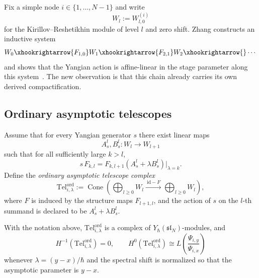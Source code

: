 Fix a simple node $i\in\{1,\dots,N-1\}$ and write
\begin{equation}
W_l:=W^{(i)}_{l,0}
\end{equation}
for the Kirillov--Reshetikhin module of level $l$ and zero shift. Zhang
constructs an inductive system
\begin{equation}
W_0\xhookrightarrow{F_{1,0}}W_1\xhookrightarrow{F_{2,1}}W_2\xhookrightarrow{}\cdots
\end{equation}
and shows that the Yangian action is affine-linear in the stage parameter
along this system~\cite{Zhang24}. The new observation is that this chain
already carries its own derived compactification.

\subsection{Ordinary asymptotic telescopes}

\begin{definition}
\label{def:ordinary-asymptotic-telescope}
Assume that for every Yangian generator $s$ there exist linear maps
\begin{equation}
A_s^l,B_s^l:W_l\longrightarrow W_{l+1}
\end{equation}
such that for all sufficiently large $k>l$,
\begin{equation}
\label{eq:ordinary-asymptotic-stage-action}
s\,F_{k,l}=F_{k,l+1}(A_s^l+\lambda B_s^l)\big|_{\lambda=k}.
\end{equation}
Define the \emph{ordinary asymptotic telescope complex}
\begin{equation}
\label{eq:ordinary-telescope-definition}
\mathrm{Tel}^{\mathrm{ord}}_{i,\lambda}
:=
\operatorname{Cone}\!\left(
\bigoplus_{l\ge 0}W_l
\xrightarrow{\ \mathrm{id}-F\ }
\bigoplus_{l\ge 0}W_l
\right),
\end{equation}
where $F$ is induced by the structure maps $F_{l+1,l}$, and the action of
$s$ on the $l$-th summand is declared to be $A_s^l+\lambda B_s^l$.
\end{definition}

\begin{theorem}
\ClaimStatusProvedHere
\label{thm:derived-realization-ordinary-asymptotic}
With the notation above, $\mathrm{Tel}^{\mathrm{ord}}_{i,\lambda}$ is a
complex of $Y_\hbar(\mathfrak{sl}_N)$-modules, and
\begin{equation}
H^{-1}(\mathrm{Tel}^{\mathrm{ord}}_{i,\lambda})=0,
\qquad
H^0(\mathrm{Tel}^{\mathrm{ord}}_{i,\lambda})
\cong
L\!\left(\frac{\Psi_{i,y}}{\Psi_{i,x}}\right)
\end{equation}
whenever $\lambda=(y-x)/\hbar$ and the spectral shift is normalized so
that the asymptotic parameter is $y-x$.
\end{theorem}

